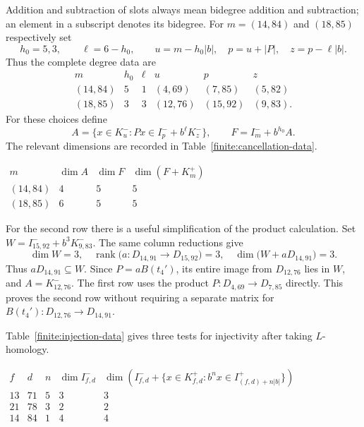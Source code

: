 \documentclass[11pt]{article}
\theoremstyle{definition}
\theoremstyle{remark}
\numberwithin{equation}{section}
\begin{document}
Addition and subtraction of slots always mean bidegree
addition and subtraction; an element in a subscript denotes its
bidegree.  For $m=(14,84)$ and $(18,85)$ respectively set
\[
 h_0=5,3,\qquad \ell=6-h_0,\qquad
 u=m-h_0|b|,\quad p=u+|P|,\quad z=p-\ell|b|.
\]
Thus the complete degree data are
\[
\begin{array}{c|cc|ccc}
 m&h_0&\ell&u&p&z\\\hline
 (14,84)&5&1&(4,69)&(7,85)&(5,82)\\
 (18,85)&3&3&(12,76)&(15,92)&(9,83).
\end{array}
\]
For these choices define
\begin{equation}\label{finite:cancellation-spaces}
 A=\{x\in K^-_u:Px\in I^-_p+b^\ell K^-_z\},
 \qquad F=I^-_m+b^{h_0}A.
\end{equation}
The relevant dimensions are recorded in
Table~\ref{finite:cancellation-data}.

\begin{table}[htbp]

\(
\begin{array}{c|rrr}
 m&\dim A&\dim F&\dim(F+K^+_m)\\\hline
 (14,84)&4&5&5\\
 (18,85)&6&5&5
\end{array}
\)
\caption{Dimensions of the cancellation subspaces.}
\label{finite:cancellation-data}
\end{table}

For the second row there is a useful simplification of the product
calculation.  Set $W=I^-_{15,92}+b^3K^-_{9,83}$.  The same column
reductions give
\begin{equation}\label{finite:factorization-containment}
 \dim W=3,\quad
 \operatorname{rank}\bigl(a\colon D_{14,91}\longrightarrow D_{15,92}\bigr)=3,
 \quad \dim\bigl(W+aD_{14,91}\bigr)=3.
\end{equation}
Thus $aD_{14,91}\subseteq W$.  Since $P=aB(t_4')$, its entire
image from $D_{12,76}$ lies in $W$, and $A=K^-_{12,76}$.
The first row uses the product $P\colon D_{4,69}\to D_{7,85}$
directly.  This proves the second row without requiring a separate
matrix for $B(t_4')\colon D_{12,76}\to D_{14,91}$.

Table~\ref{finite:injection-data} gives three tests for injectivity
after taking $L$-homology.

\begin{table}[htbp]

\(
\begin{array}{ccr|rr}
 f&d&n&\dim I^-_{f,d}&
 \dim\left(I^-_{f,d}+
  \{x\in K^+_{f,d}:b^nx\in I^+_{(f,d)+n|b|}\}\right)\\\hline
 13&71&5&3&3\\
 21&78&3&2&2\\
 14&84&1&4&4
\end{array}
\)
\caption{Enclosure tests for injectivity on fifth-differential homology.}
\label{finite:injection-data}
\end{table}
\end{document}
